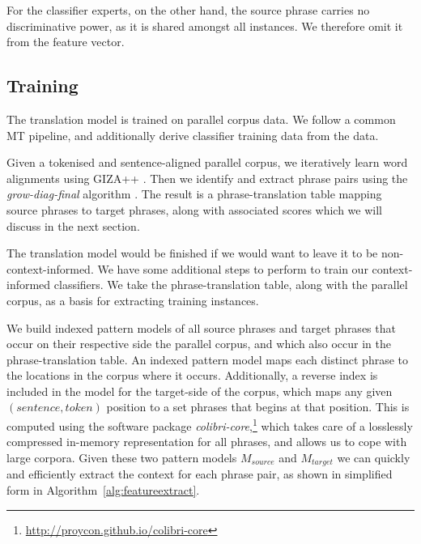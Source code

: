 \documentclass[smallextended]{svjour3}       %
\theoremstyle{break}
\begin{document}
For the classifier experts, on the other hand, the source
phrase carries no discriminative power, as it is shared amongst all instances. We
therefore omit it from the feature vector.

\subsection{Training}

The translation model is trained on parallel corpus data. We follow a common
MT pipeline, and additionally derive classifier training data from the data.

Given a tokenised and sentence-aligned parallel corpus, we iteratively learn
word alignments using GIZA++ \citep{GIZA}. Then we identify and extract phrase
pairs using the {\em grow-diag-final}\/ algorithm \citep{OchNey2003}. The
result is a phrase-translation table mapping source phrases to target
phrases, along with associated scores which we will discuss in the next
section. %

The translation model would be finished if we would want to leave it to be
non-context-informed. We have some additional steps to perform to train our
context-informed classifiers. We take the phrase-translation table, along with
the parallel corpus, as a basis for extracting training instances.

We build indexed pattern models of all source phrases and target
phrases that occur on their respective side the parallel corpus, and
which also occur in the phrase-translation table. An indexed pattern
model maps each distinct phrase to the locations in the corpus where
it occurs.  Additionally, a reverse index is included in the model for
the target-side of the corpus, which maps any given
$(sentence, token)$ position to a set phrases that begins at that
position.  This is computed using the software package
\emph{colibri-core},\footnote{\url{http://proycon.github.io/colibri-core}}
which takes care of a losslessly compressed in-memory representation
for all phrases, and allows us to cope with large corpora. Given these
two pattern models $M_{source}$ and $M_{target}$ we can quickly and
efficiently extract the context for each phrase pair, as shown in
simplified form in Algorithm~\ref{alg:featureextract}.
\end{document}
